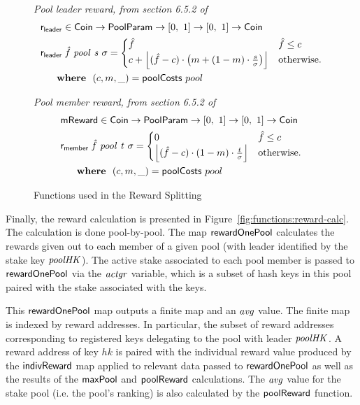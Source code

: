 \begin{figure}[htb]
  \emph{Pool leader reward, from section 6.5.2 of \cite{delegation_design}}
  \begin{align*}
      & \fun{r_{leader}} \in \Coin \to \PoolParam \to \unitInterval \to \unitInterval \to \Coin \\
      & \lReward{\hat{f}}{pool}{s}{\sigma} =
        \begin{cases}
        \hat{f} & \hat{f} \leq c\\
        c + \floor*{(\hat{f} - c)\cdot\left(m + (1-m)\cdot\frac{s}{\sigma}\right) }&
        \text{otherwise.}
      \end{cases} \\
      & ~~~\where (c, m, \_) = \fun{poolCosts}~pool \\
  \end{align*}

  \emph{Pool member reward, from section 6.5.2 of \cite{delegation_design}}
  \begin{align*}
    & \fun{mReward} \in \Coin \to \PoolParam \to \unitInterval \to \unitInterval \to \Coin \\
    & \mReward{\hat{f}}{pool}{t}{\sigma} =
      \begin{cases}
        0 & \hat{f} \leq c\\
        \floor*{(\hat{f} - c)\cdot(1-m)\cdot\frac{t}{\sigma}} &
        \text{otherwise.}
      \end{cases} \\
    & ~~~\where (c, m, \_) = \fun{poolCosts}~pool \\
  \end{align*}

  \caption{Functions used in the Reward Splitting}
  \label{fig:functions:reward-splitting}
\end{figure}


Finally, the reward calculation is presented in
Figure~\ref{fig:functions:reward-calc}. The calculation is done pool-by-pool.
The map $\fun{rewardOnePool}$ calculates the rewards given out to each member
of a given pool (with leader identified by
the stake key $\var{poolHK}$). The active stake associated to each
pool member is passed to $\fun{rewardOnePool}$
via the $\var{actgr}$ variable, which is a subset of hash keys in this pool
paired with the stake associated with the keys.

This $\fun{rewardOnePool}$ map outputs a finite map and an $\var{avg}$
value. The finite map is indexed
by reward addresses. In particular, the subset of reward addresses corresponding
to registered keys delegating to the pool with leader $\var{poolHK}$.
A reward address of key $hk$ is paired with the individual reward value
produced by the $\fun{indivReward}$ map applied to relevant data passed to
$\fun{rewardOnePool}$ as well as the results of the $\fun{maxPool}$
and $\fun{poolReward}$ calculations. The $\var{avg}$ value for the stake pool
(i.e. the pool's ranking) is also calculated by the $\fun{poolReward}$ function.


